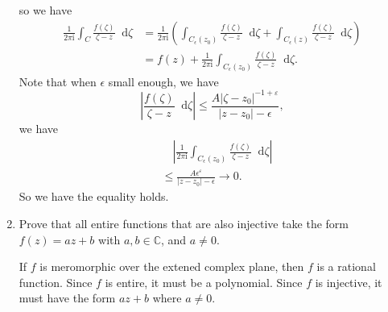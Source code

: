 \documentclass[11pt]{report}
\theoremstyle{mythm}
\let\oldendproof\endproof
\renewenvironment{proof}[1][\proofname]{%
  \oldproof[\normalfont \bfseries #1]%
}{\oldendproof}
\renewcommand*{\proofname}{Proof}
\theoremstyle{myans}
\newcommand{\mi}{\mathrm{i}}
\newcommand{\dd}{\mathop{}\!\mathrm{d}}
\newcommand{\bbC}{\mathbb{C}}
\begin{document}
\begin{enumerate}
\begin{proof}
    so we have
    \begin{align*}
      \frac 1{2\pi \mi} \int_C \frac{f(\zeta)}{\zeta-z}\dd \zeta &=
      \frac 1{2\pi \mi} \left( \int_{C_\epsilon(z_0)} \frac{f(\zeta)}{\zeta-z}\dd \zeta
      +\int_{C_\epsilon(z)} \frac{f(\zeta)}{\zeta-z}\dd \zeta \right) \\
      &= f(z) + \frac 1{2\pi \mi}\int_{C_\epsilon(z_0)} \frac{f(\zeta)}{\zeta-z}\dd \zeta.
    \end{align*}
    Note that when $\epsilon$ small enough, we have
    \[ \left|\frac{f(\zeta)}{\zeta-z}\dd \zeta\right| \leq \frac{A|\zeta - z_0|^{-1+\varepsilon}}{|z-z_0|-\epsilon}, \]
    we have
    \begin{align*}
      &\quad \left|\frac 1{2\pi \mi}\int_{C_\epsilon(z_0)} \frac{f(\zeta)}{\zeta-z}\dd \zeta\right|\\
      &\leq \frac{A \epsilon^{\varepsilon}}{|z-z_0|- \epsilon} \to 0.
    \end{align*}
    So we have the equality holds.
  \end{proof}
  \item Prove that all entire functions that are also injective take the form
  $f(z)=az+b$ with $a, b \in \bbC$, and $a\neq 0$.
  \begin{proof}
    If $f$ is meromorphic over the extened complex plane, then $f$ is a rational function.
    Since $f$ is entire, it must be a polynomial. Since $f$ is injective, it must have the
    form $az+b$ where $a\neq 0$.


\end{proof}
\end{enumerate}
\end{document}
